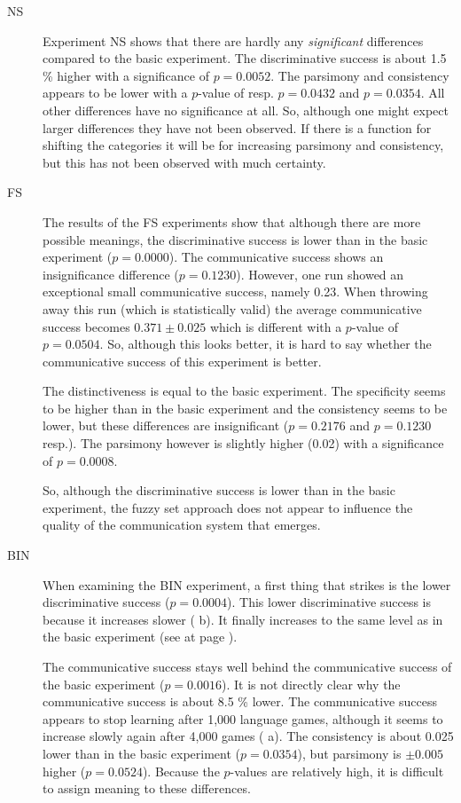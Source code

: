 \begin{description}
\item[NS] Experiment NS shows that there are hardly any {\em significant} differences compared to the basic experiment. The discriminative success is about 1.5 \% higher with a significance of $p=0.0052$. The parsimony and consistency appears to be lower with a $p$-value of resp. $p=0.0432$ and $p=0.0354$. All other differences have no significance at all. So, although one might expect larger differences they have not been observed. If there is a function for shifting the categories it will be for increasing parsimony and consistency, but this has not been observed with much certainty.

\item[FS] The results of the FS experiments show that although there are more possible meanings, the discriminative success is lower than in the basic experiment ($p=0.0000$). The communicative success shows an insignificance difference ($p=0.1230$). However,  one run showed an exceptional small communicative success, namely 0.23. When throwing away this run (which is statistically valid) the average communicative success becomes $0.371 \pm 0.025$ which is different with a $p$-value of $p=0.0504$. So, although this looks better, it is hard to say whether the communicative success of this experiment is better. 

The distinctiveness is equal to the basic experiment. The specificity seems to be higher than in the basic experiment and the consistency seems to be lower, but these differences are insignificant ($p=0.2176$ and $p=0.1230$ resp.). The parsimony however is slightly higher (0.02) with a significance of $p=0.0008$.

So, although the discriminative success is lower than in the basic experiment, the fuzzy set approach does not appear to influence the quality of the communication system that emerges. 

\item[BIN] When examining the BIN experiment, a first thing that strikes is the lower discriminative success ($p=0.0004$). This lower discriminative success is because it increases slower ( b). It finally increases to the same level as in the basic experiment (see  at page \pageref{f:st:plot}).

The communicative success stays well behind the communicative success of the basic experiment ($p=0.0016$). It is not directly clear why the communicative success is about 8.5 \% lower. The communicative success appears to stop learning after 1,000 language games, although it seems to increase slowly again after 4,000 games ( a). The consistency is about 0.025 lower than in the basic experiment ($p=0.0354$), but parsimony is $\pm 0.005$ higher ($p=0.0524$). Because the $p$-values are relatively high, it is difficult to assign meaning to these differences.


\end{description}
